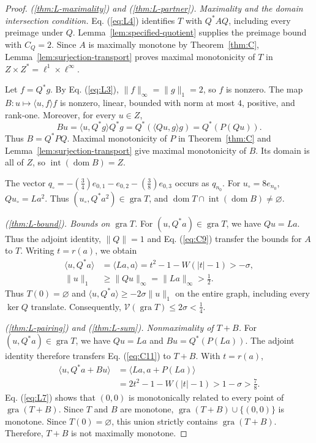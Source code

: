 \documentclass[11pt]{article}
\newcommand{\gra}{\operatorname{gra}}
\newcommand{\dom}{\operatorname{dom}}
\newcommand{\pair}[2]{\langle #1,#2\rangle}
\theoremstyle{definition}
\theoremstyle{remark}
\begin{document}
\begin{proof}
\noindent\textit{\textup{(\ref{thm:L-maximality})} and \textup{(\ref{thm:L-partner})}. Maximality and the domain intersection condition.}
Eq. (\ref{eq:L4}) identifies $T$ with $Q^*AQ$, including every preimage under $Q$. Lemma~\ref{lem:specified-quotient} supplies the preimage bound with $C_Q=2$. Since $A$ is maximally monotone by Theorem~\ref{thm:C}, Lemma~\ref{lem:surjection-transport} proves maximal monotonicity of $T$ in $Z\times Z^*=\ell^1\times\ell^\infty$.

\label{sec:L4}
Let $f=Q^*g$. By Eq. (\ref{eq:L3}), $\|f\|_\infty=\|g\|_1=2$, so $f$ is nonzero. The map $B:u\mapsto\pair{u}{f}f$ is nonzero, linear, bounded with norm at most $4$, positive, and rank-one. Moreover, for every $u\in Z$,
\[
Bu=\pair{u}{Q^*g}Q^*g
   =Q^*(\pair{Qu}{g}g)
   =Q^*(P(Qu)).
\]
Thus $B=Q^*PQ$. Maximal monotonicity of $P$ in Theorem~\ref{thm:C} and Lemma~\ref{lem:surjection-transport} give maximal monotonicity of $B$. Its domain is all of $Z$, so $\operatorname{int}(\dom B)=Z$.

The vector $q_\circ=-(\frac{3}{4})e_{0,1}-e_{0,2}-(\frac{3}{8})e_{0,3}$ occurs as $q_{n_0}$. For $u_\circ=8e_{n_0}$, $Qu_\circ=La^2$. Thus $(u_\circ,Q^*a^2)\in\gra T$, and $\dom T\cap\operatorname{int}(\dom B)\ne\varnothing$.

\noindent\textit{\textup{(\ref{thm:L-bound})}. Bounds on $\gra T$.}
\label{sec:L3}
For $(u,Q^*a)\in\gra T$, we have $Qu=La$. Thus the adjoint identity, $\|Q\|=1$ and Eq. (\ref{eq:C9}) transfer the bounds for $A$ to $T$. Writing $t=r(a)$, we obtain
\begin{equation}
\begin{aligned}
\pair{u}{Q^*a}&=\pair{La}{a}
 =t^2-1-W(|t|-1)>-\sigma,\\
\|u\|_1&\ge\|Qu\|_\infty=\|La\|_\infty>\frac{1}{2}.
\end{aligned}
\label{eq:L6}
\end{equation}
Thus $T(0)=\varnothing$ and $\pair{u}{Q^*a}\ge-2\sigma\|u\|_1$ on the entire graph, including every $\ker Q$ translate. Consequently, $\mathcal V(\gra T)\le2\sigma<\frac{1}{4}$.

\noindent\textit{\textup{(\ref{thm:L-pairing})} and \textup{(\ref{thm:L-sum})}. Nonmaximality of $T+B$.}
\label{sec:L5}
For $(u,Q^*a)\in\gra T$, we have $Qu=La$ and $Bu=Q^*(P(La))$. The adjoint identity therefore transfers Eq. (\ref{eq:C11}) to $T+B$. With $t=r(a)$,
\begin{equation}
\begin{aligned}
\pair{u}{Q^*a+Bu}
 &=\pair{La}{a+P(La)}\\
 &=2t^2-1-W(|t|-1)>1-\sigma>\frac{7}{8}.
\end{aligned}
\label{eq:L7}
\end{equation}
Eq. (\ref{eq:L7}) shows that $(0,0)$ is monotonically related to every point of $\gra(T+B)$. Since $T$ and $B$ are monotone, $\gra(T+B)\cup\{(0,0)\}$ is monotone. Since $T(0)=\varnothing$, this union strictly contains $\gra(T+B)$. Therefore, $T+B$ is not maximally monotone.
\end{proof}
\end{document}
